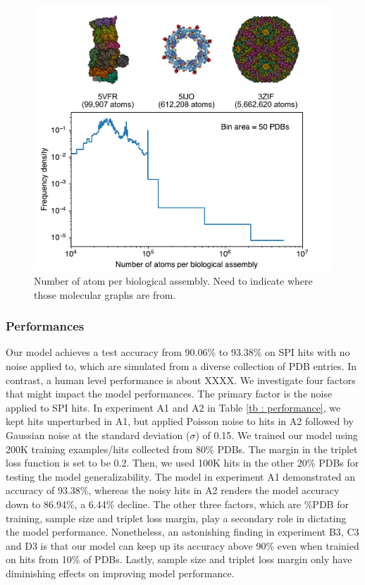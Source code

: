 \begin{figure}
\includegraphics[width=1.0\textwidth,keepaspectratio]
{./figures/num_atom_per_bio_assem.pdf}
\caption{Number of atom per biological assembly. {\color{red} Need to indicate where
those molecular graphs are from.}}
\label{fig: num atom per bio assem}
\end{figure}


\subsubsection{Performances}

Our model achieves a test accuracy from 90.06\% to 93.38\% on SPI hits with no
noise applied to, which are simulated from a diverse collection of PDB entries.
In contrast, a human level performance is about {\color{red}XXXX}.  We
investigate four factors that might impact the model performances.  The primary
factor is the noise applied to SPI hits.  In experiment A1 and A2 in Table
\ref{tb : performance}, we kept hits unperturbed in A1, but applied Poisson
noise to hits in A2 followed by Gaussian noise at the standard deviation
({\color{red}$\sigma$}) of 0.15.  We trained our model using 200K training
examples/hits collected from 80\% PDBs.  The margin in the triplet loss function
is set to be 0.2.  Then, we used 100K hits in the other 20\% PDBs for testing
the model generalizability.  The model in experiment A1 demonstrated an accuracy
of 93.38\%, whereas the noisy hits in A2 renders the model accuracy down to
86.94\%, a 6.44\% decline.  The other three factors, which are \%PDB for
training, sample size and triplet loss margin, play a secondary role in
dictating the model performance.  Nonetheless, an astonishing finding in
experiment B3, C3 and D3 is that our model can keep up its accuracy above 90\%
even when trainied on hits from 10\% of PDBs.  Lastly, sample size and triplet
loss margin only have diminishing effects on improving model performance.  

